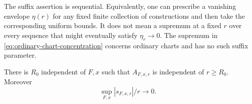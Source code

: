 \begin{remark}
\label{rem:suffix-envelope}
The suffix assertion is sequential.  Equivalently, one can prescribe
a vanishing envelope $\eta(r)$ for any fixed finite collection of
constructions and then take the corresponding uniform bounds.  It
does not mean a supremum at a fixed $r$ over every sequence that might
eventually satisfy $\eta_r\to0$.  The supremum in
\eqref{eq:ordinary-chart-concentration} concerns ordinary charts and
has no such suffix parameter.
\end{remark}

\begin{lemma}
\label{lem:scale-stabilization}
There is $R_0$ independent of $F,x$ such that $A_{F,x,r}$ is independent
of $r\ge R_0$.  Moreover
\[
 \sup_{F,x}|s_{F,x,r}|/r\longrightarrow0.
\]
\end{lemma}

